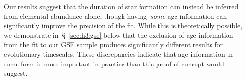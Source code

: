 \documentclass[ms.tex]{subfiles}
\begin{document}
Our results suggest that the duration of star formation can instead be inferred
from elemental abundance alone, though having~\textit{some} age information can
significantly improve the precision of the fit.
While this is theoretically possible, we demonstrate in~\S~\ref{sec:h3:gse}
below that the exclusion of age information from the fit to our GSE sample
produces significantly different results for evolutionary timescales.
These discrepancies indicate that age information in some form is more
important in practice than this proof of concept would suggest.
\end{document}
